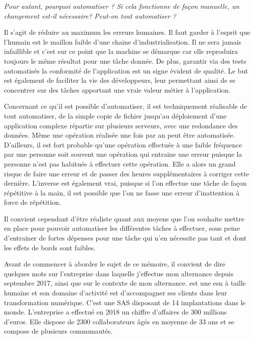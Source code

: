 \emph{Pour autant, pourquoi automatiser ? Si cela fonctionne de façon manuelle, un changement est-il nécessaire? Peut-on tout automatiser ?}

Il s'agit de réduire au maximum les erreurs humaines. Il faut garder à l'esprit que l'humain est le maillon faible d'une chaine d'industrialisation. Il ne sera jamais infaillible et c'est sur ce point que la machine se démarque car elle reproduira toujours le même résultat pour une tâche donnée. De plus, garantir via des tests automatisés la conformité de l'application est un signe évident de qualité. Le but est également de faciliter la vie des développeurs, leur permettant ainsi de se concentrer sur des tâches apportant une vraie valeur métier à l'application.

Concernant ce qu'il est possible d'automatiser, il est techniquement réalisable de tout automatiser, de la simple copie de fichier jusqu'au déploiement d'une application complexe répartie sur plusieurs serveurs, avec une redondance des données. Même une opération réalisée une fois par an peut être automatisée. D'ailleurs, il est fort probable qu'une opération effectuée à une faible fréquence par une personne soit souvent une opération qui entraine une erreur puisque la personne n'est pas habituée à effectuer cette opération. Elle a alors un grand risque de faire une erreur et de passer des heures supplémentaires à corriger cette dernière. L'inverse est également vrai, puisque si l'on effectue une tâche de façon répétitive à la main, il est possible que l'on ne fasse une erreur d'inattention à force de répétition. 

Il convient cependant d'être réaliste quant aux moyens que l'on souhaite mettre en place pour pouvoir automatiser les différentes tâches à effectuer, sous peine d'entrainer de fortes dépenses pour une tâche qui n'en nécessite pas tant et dont les effets de bords sont faibles.

Avant de commencer à aborder le sujet de ce mémoire, il convient de dire quelques mots sur l'entreprise dans laquelle j'effectue mon alternance depuis septembre 2017, \onepoint{} ainsi que sur le contexte de mon alternance. \xmakefirstuc{\onepoint{}} est une \gls{esn} à taille humaine et son domaine d'activité est d'accompagner ses clients dans leur transformation numérique. C'est une \gls{SAS} disposant de 14 implantations dans le monde. L'entreprise a effectué en 2018 un chiffre d'affaires de 300 millions d'euros. Elle dispose de 2300 collaborateurs âgés en moyenne de 33 ans et se compose de plusieurs communautés.

